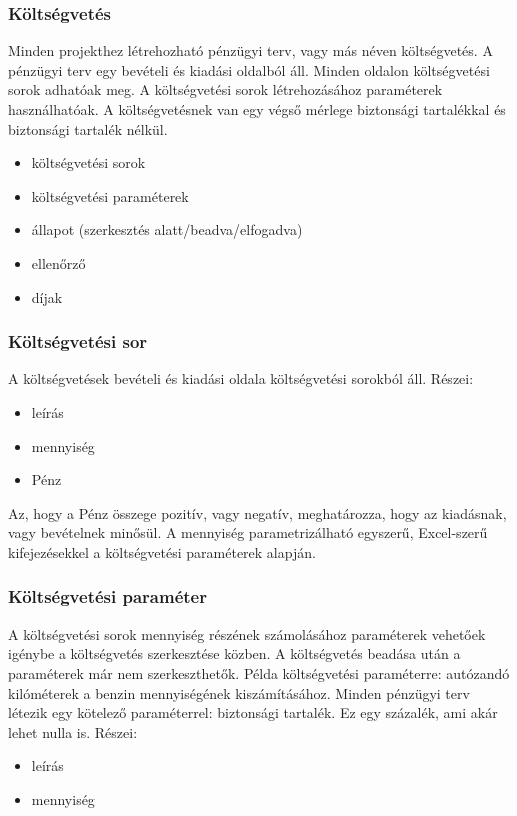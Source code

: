 \documentclass[a4paper,12pt]{article}
\begin{document}
\subsubsection{Költségvetés}
Minden projekthez létrehozható pénzügyi terv, vagy más néven költségvetés. A pénzügyi terv egy bevételi és kiadási oldalból áll. Minden oldalon költségvetési sorok adhatóak meg. A költségvetési sorok létrehozásához paraméterek használhatóak. A költségvetésnek van egy végső mérlege biztonsági tartalékkal és biztonsági tartalék nélkül.
\begin{itemize}
  \item költségvetési sorok
  \item költségvetési paraméterek
  \item állapot (szerkesztés alatt/beadva/elfogadva)
  \item ellenőrző
  \item díjak
\end{itemize}
\subsubsection{Költségvetési sor}
A költségvetések bevételi és kiadási oldala költségvetési sorokból áll. Részei:
\begin{itemize}
  \item leírás
  \item mennyiség
  \item Pénz
\end{itemize}
Az, hogy a Pénz összege pozitív, vagy negatív, meghatározza, hogy az kiadásnak, vagy bevételnek minősül. A mennyiség parametrizálható egyszerű, Excel-szerű kifejezésekkel a költségvetési paraméterek alapján.
\subsubsection{Költségvetési paraméter}
A költségvetési sorok mennyiség részének számolásához paraméterek vehetőek igénybe a költségvetés szerkesztése közben. A költségvetés beadása után a paraméterek már nem szerkeszthetők. Példa költségvetési paraméterre: autózandó kilóméterek a benzin mennyiségének kiszámításához. Minden pénzügyi terv létezik egy kötelező paraméterrel: biztonsági tartalék. Ez egy százalék, ami akár lehet nulla is. Részei:
\begin{itemize}
  \item leírás
  \item mennyiség
\end{itemize}
\end{document}
